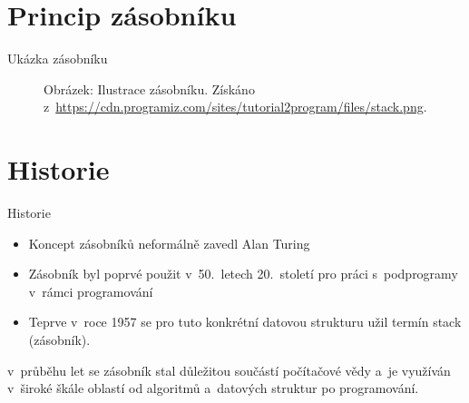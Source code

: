 \documentclass{beamer}
\begin{document}
\section{Princip zásobníku}
\begin{frame}{Ukázka zásobníku}
    
\begin{figure}[h]
    \centering
    \caption{Obrázek: Ilustrace zásobníku. Získáno z~\url{https://cdn.programiz.com/sites/tutorial2program/files/stack.png}.}
\end{figure}
\end{frame}

\section{Historie}
\begin{frame}{Historie}
  \begin{itemize}
  \item Koncept zásobníků neformálně zavedl Alan Turing\cite{duplessis2023}
    \item Zásobník byl poprvé použit v~50.~letech 20.~století pro práci s~podprogramy v~rámci programování      
        \item Teprve v~roce 1957 se pro tuto konkrétní datovou strukturu užil termín stack (zásobník).
  \end{itemize}
  \vspace{3.0em}
    \begin{block}
    
    v~průběhu let se zásobník stal důležitou součástí počítačové vědy a~je využíván v~široké škále oblastí od algoritmů a~datových struktur po programování.
    \end{block}
\end{frame}
\end{document}
